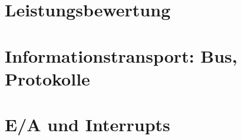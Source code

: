 \documentclass{scrreprt}
\begin{document}
\chapter{Leistungsbewertung}


\chapter{Informationstransport: Bus, Protokolle}


\chapter{E/A und Interrupts}


\renewcommand{\unimptnt}[1]{}


\end{document}
